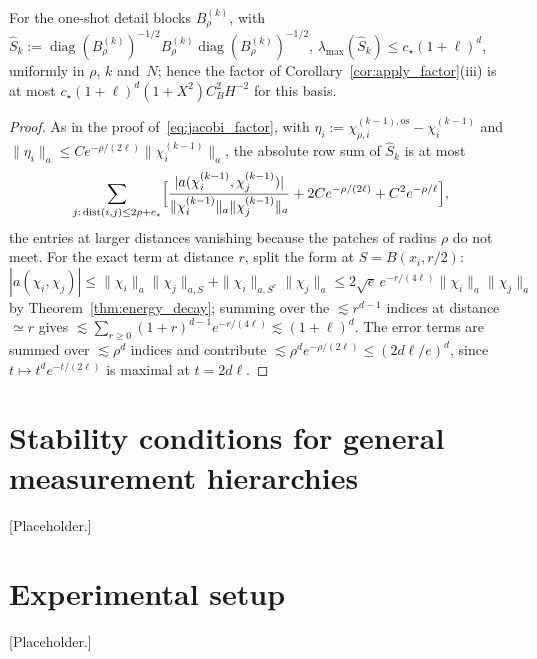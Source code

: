 \begin{lemma}\label{lem:oneshot_rowsum}
For the one-shot detail blocks $B^{(k)}_\rho$, with
$\widehat{S}_k := \operatorname{diag}(B^{(k)}_\rho)^{-1/2} B^{(k)}_\rho
\operatorname{diag}(B^{(k)}_\rho)^{-1/2}$,
$\lambda_{\max}(\widehat{S}_k) \leq c_\star (1 + \ell)^{d}$, uniformly in
$\rho$, $k$ and~$N$; hence the factor of
Corollary~\ref{cor:apply_factor}(iii) is at most
$c_\star (1 + \ell)^d (1 + X^2) C_B^2 H^{-2}$ for this basis.
\end{lemma}

\begin{proof}
As in the proof of~\eqref{eq:jacobi_factor}, with
$\eta_i := \chi^{(k-1),\mathrm{os}}_{\rho,i} - \chi^{(k-1)}_i$ and
$\|\eta_i\|_a \leq C e^{-\rho/(2\ell)} \|\chi^{(k-1)}_i\|_a$, the
absolute row sum of $\widehat{S}_k$ is at most
\[
  \sum_{j:\, \operatorname{dist}(i,j) \leq 2\rho + c_\star}
  \Bigl[ \frac{|a(\chi^{(k-1)}_i, \chi^{(k-1)}_j)|}
              {\|\chi^{(k-1)}_i\|_a \|\chi^{(k-1)}_j\|_a}
    + 2 C e^{-\rho/(2\ell)} + C^2 e^{-\rho/\ell} \Bigr],
\]
the entries at larger distances vanishing because the patches of radius
$\rho$ do not meet.  For the exact term at distance $r$, split the form
at $S = B(x_i, r/2)$: $|a(\chi_i, \chi_j)| \leq
\|\chi_i\|_{a}\|\chi_j\|_{a,S} + \|\chi_i\|_{a,S^c}\|\chi_j\|_a
\leq 2\sqrt{e}\, e^{-r/(4\ell)} \|\chi_i\|_a \|\chi_j\|_a$ by
Theorem~\ref{thm:energy_decay}; summing over the $\lesssim r^{d-1}$
indices at distance $\simeq r$ gives
$\lesssim \sum_{r \geq 0} (1+r)^{d-1} e^{-r/(4\ell)} \lesssim (1+\ell)^d$.
The error terms are summed over $\lesssim \rho^d$ indices and
contribute $\lesssim \rho^d e^{-\rho/(2\ell)} \leq (2d\ell/e)^d$, since
$t \mapsto t^d e^{-t/(2\ell)}$ is maximal at $t = 2d\ell$.
\end{proof}

\section{Stability conditions for general measurement hierarchies}
\label{app:stability}
[Placeholder.]

\section{Experimental setup}
\label{app:setup}
[Placeholder.]
